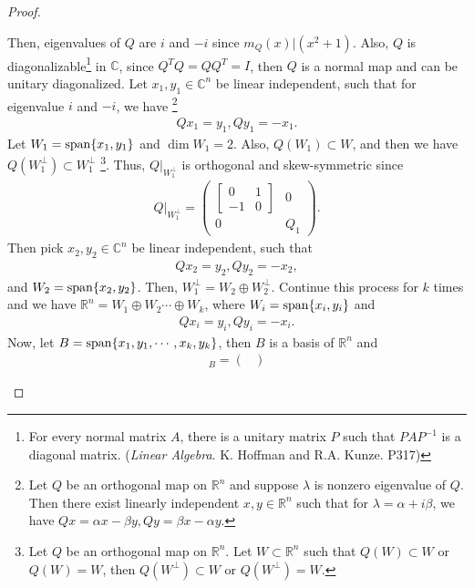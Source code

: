 \documentclass[11pt]{article}
\theoremstyle{definition}
\numberwithin{equation}{subsection}
\begin{document}
\begin{proof}
\begin{enumerate}[label=(\alph*)]
    Then, eigenvalues of $Q$ are $i$ and $-i$ since $m_Q(x)|(x^2 + 1)$. Also, $Q$ is diagonalizable\footnote{For every normal matrix $A$, there is a unitary matrix $P$ such that $PAP^{-1}$ is a diagonal matrix. ({\em Linear Algebra}. K. Hoffman  and R.A. Kunze. P317)} in $\mathbb{C}$, since $Q^T Q = Q Q^T = I$, then $Q$ is a normal map and can be unitary diagonalized\cite{4}. Let $x_1, y_1 \in \mathbb{C}^n$ be linear independent, such that for eigenvalue $i$ and $-i$, we have \footnote{Let $Q$ be an orthogonal map on $\mathbb{R}^n$ and suppose $\lambda$ is nonzero eigenvalue of $Q$. Then there exist linearly independent $x,y \in \mathbb{R}^n$ such that for $\lambda = \alpha + i \beta$, we have $Qx = \alpha x - \beta y, Qy = \beta x - \alpha y$.} 
    \begin{align*}
        Q x_1 = y_1, Q y_1 = - x_1.
    \end{align*}
    Let $W_1 = {\rm span}\{x_1, y_1\}$ and $\dim W_1 = 2$. Also, $Q(W_1) \subset W$, and then we have $Q(W_1^\bot) \subset W_1^\bot$ \footnote{Let $Q$ be an orthogonal map on $\mathbb{R}^n$. Let $W \subset \mathbb{R}^n$ such that $Q(W) \subset W$ or $Q(W) = W$, then $Q(W^\bot) \subset W$ or $Q(W^\bot) = W$.}. Thus, $Q|_{W_1^\bot}$ is orthogonal and skew-symmetric since 
    \begin{align*}
        Q|_{W_1^\bot} = \begin{pmatrix}
            \left[\begin{array}{cc}0 & 1\\-1 & 0\end{array}\right] & 0 \\
            0 & Q_1
        \end{pmatrix}.
    \end{align*}
    Then pick $x_2, y_2 \in \mathbb{C}^n$ be linear independent, such that 
    \begin{align*}
        Q x_2 = y_2, Q y_2 = - x_2,
    \end{align*}
    and $W_2 = {\rm span}\{x_2, y_2\}$. Then, $W_1^\bot = W_2 \oplus W_2^\bot$. Continue this process for $k$ times and we have $\mathbb{R}^n = W_1 \oplus W_2 \cdots \oplus W_k$, where $W_i = {\rm span}\{x_i, y_i\}$ and 
    \begin{align*}
        Q x_i = y_i, Q y_i = - x_i.
    \end{align*}
    Now, let $B = {\rm span}\{x_1, y_1, \cdots, x_k, y_k\}$, then $B$ is a basis of $\mathbb{R}^n$ and 
    \begin{align*}
        [Q]_B = 
        \begin{pmatrix}

\end{pmatrix}
\end{align*}
\end{enumerate}
\end{proof}
\end{document}
